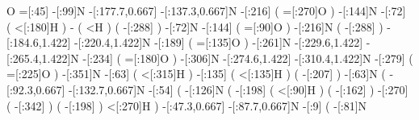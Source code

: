                    O%
             =[:45]%
             -[:99]N%
    -[:177.7,0.667]%
    -[:137.3,0.667]N%
            -[:216]%
                      (
                =[:270]O%
                      )
            -[:144]N%
             -[:72]%
                      (
                <[:180]H%
                      )
                  -%
                      (
                      <H%
                      )
                      (
                -[:288]\phantom{N}%
                      )
             -[:72]N%
            -[:144]%
                      (
                 =[:90]O%
                      )
            -[:216]N%
                      (
                -[:288]%
                      )
    -[:184.6,1.422]%
    -[:220.4,1.422]N%
            -[:189]%
                      (
                =[:135]O%
                      )
            -[:261]N%
    -[:229.6,1.422]%
    -[:265.4,1.422]N%
            -[:234]%
                      (
                =[:180]O%
                      )
            -[:306]N%
    -[:274.6,1.422]%
    -[:310.4,1.422]N%
            -[:279]%
                      (
                =[:225]O%
                      )
            -[:351]N%
             -[:63]%
                      (
                <[:315]H%
                      )
            -[:135]%
                      (
                <[:135]H%
                      )
                      (
                -[:207]\phantom{N}%
                      )
             -[:63]N%
                      (
         -[:92.3,0.667]%
        -[:132.7,0.667]N%
                 -[:54]%
                          (
                    -[:126]N%
                              (
                        -[:198]%
                                  (
                             <[:90]H%
                                  )
                                  (
                            -[:162]\phantom{N}%
                                  )
                        -[:270]%
                                  (
                            -[:342]\phantom{N}%
                                  )
                                  (
                            -[:198]\phantom{N}%
                                  )
                        <[:270]H%
                              )
             -[:47.3,0.667]%
             -[:87.7,0.667]N%
                      -[:9]%
                              (
                         -[:81]N%
